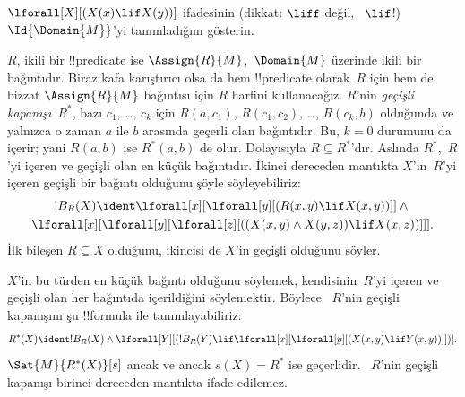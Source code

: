 \begin{prob}
$\lforall[X][(X(x) \lif X(y))]$ ifadesinin (dikkat: $\liff$ değil,
~$\lif$!) $\Id{\Domain{M}}$'yi tanımladığını gösterin.
\end{prob}

\begin{ex}
$R$, ikili bir !!{predicate} ise $\Assign{R}{M}$,~$\Domain{M}$ üzerinde
ikili bir bağıntıdır. Biraz kafa karıştırıcı olsa da hem !!{predicate}
olarak~$R$ için hem de bizzat $\Assign{R}{M}$ bağıntısı için $R$ harfini
kullanacağız. $R$'nin \emph{geçişli kapanışı}~$R^*$, bazı
$c_1$, \dots, $c_k$ için $R(a,c_1)$, $R(c_1,c_2)$, \dots, $R(c_k,b)$
olduğunda ve yalnızca o zaman $a$ ile $b$ arasında geçerli olan bağıntıdır.
Bu, $k=0$ durumunu da içerir; yani $R(a,b)$ ise $R^*(a,b)$ de olur.
Dolayısıyla $R \subseteq R^*$'dır. Aslında $R^*$,~$R$'yi içeren ve geçişli
olan en küçük bağıntıdır. İkinci dereceden mantıkta $X$'in~$R$'yi içeren
geçişli bir bağıntı olduğunu şöyle söyleyebiliriz:
\begin{multline*}
  !B_R(X) \ident \lforall[x][\lforall[y][(R(x,y) \lif X(x, y))]] \land {}\\
\lforall[x][\lforall[y][\lforall[z][((X(x,y) \land X(y,z)) \lif X(x,
      z))]]].
\end{multline*}
İlk bileşen $R \subseteq X$ olduğunu, ikincisi de $X$'in geçişli olduğunu
söyler.

$X$'in bu türden en küçük bağıntı olduğunu söylemek, kendisinin~$R$'yi
içeren ve geçişli olan her bağıntıda içerildiğini söylemektir. Böylece
~$R$'nin geçişli kapanışını şu !!{formula} ile tanımlayabiliriz:
\[
R^*(X) \ident !B_R(X) \land \lforall[Y][(!B_R(Y) \lif
  \lforall[x][\lforall[y][(X(x, y) \lif Y(x,y))]])].
\]
$\Sat{M}{R^*(X)}[s]$ ancak ve ancak $s(X)=R^*$ ise geçerlidir.
~$R$'nin geçişli kapanışı birinci dereceden mantıkta ifade edilemez.
\end{ex}

